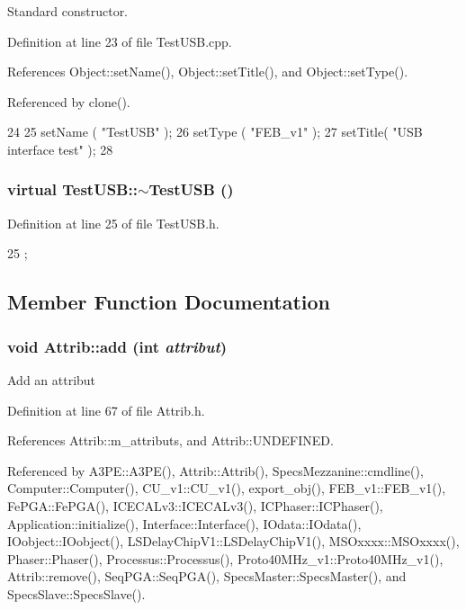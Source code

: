 Standard constructor. 

Definition at line 23 of file TestUSB.cpp.

References Object::setName(), Object::setTitle(), and Object::setType().

Referenced by clone().


\begin{DoxyCode}
24 {
25   setName ( "TestUSB" );
26   setType ( "FEB_v1" );
27   setTitle( "USB interface test" );  
28 }
\end{DoxyCode}
\hypertarget{classTestUSB_aaf3f78695bc950b0bd49c2d60494cd44}{
\subsubsection[{$\sim$TestUSB}]{\setlength{\rightskip}{0pt plus 5cm}virtual TestUSB::$\sim$TestUSB ()}}
\label{classTestUSB_aaf3f78695bc950b0bd49c2d60494cd44}


Definition at line 25 of file TestUSB.h.


\begin{DoxyCode}
25 {}; 
\end{DoxyCode}


\subsection{Member Function Documentation}
\hypertarget{classAttrib_a235f773af19c900264a190b00a3b4ad7}{
\subsubsection[{add}]{\setlength{\rightskip}{0pt plus 5cm}void Attrib::add (int {\em attribut})}}
\label{classAttrib_a235f773af19c900264a190b00a3b4ad7}
Add an attribut 

Definition at line 67 of file Attrib.h.

References Attrib::m\_\-attributs, and Attrib::UNDEFINED.

Referenced by A3PE::A3PE(), Attrib::Attrib(), SpecsMezzanine::cmdline(), Computer::Computer(), CU\_\-v1::CU\_\-v1(), export\_\-obj(), FEB\_\-v1::FEB\_\-v1(), FePGA::FePGA(), ICECALv3::ICECALv3(), ICPhaser::ICPhaser(), Application::initialize(), Interface::Interface(), IOdata::IOdata(), IOobject::IOobject(), LSDelayChipV1::LSDelayChipV1(), MSOxxxx::MSOxxxx(), Phaser::Phaser(), Processus::Processus(), Proto40MHz\_\-v1::Proto40MHz\_\-v1(), Attrib::remove(), SeqPGA::SeqPGA(), SpecsMaster::SpecsMaster(), and SpecsSlave::SpecsSlave().


